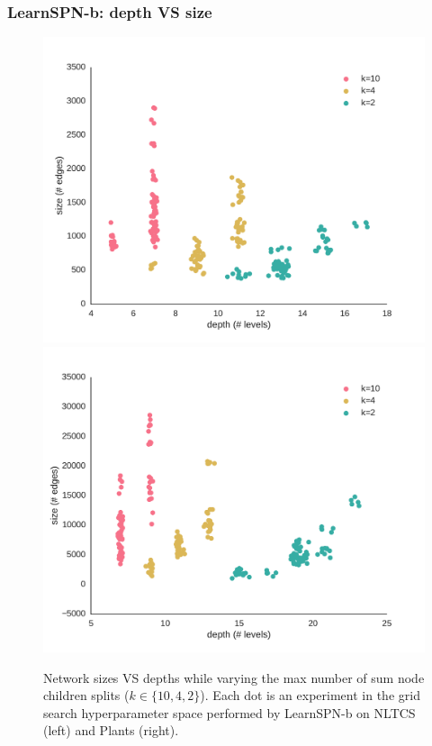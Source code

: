\documentclass[10pt, t, xcolor={usenames,dvipsnames,svgnames}, compress]{beamer}
\begin{document}
\begin{frame}
  \frametitle{LearnSPN-b: depth VS size}
  \begin{figure}[htbp]
    \begin{center}
      \includegraphics[width=0.5\linewidth]{figures/nltcs-depth.pdf}
      \includegraphics[width=0.5\linewidth]{figures/plants-depth.pdf}
      \caption{\footnotesize
        Network sizes VS depths while varying the max
        number of sum node children splits ($k\in\{10, 4, 2\}$). Each dot is an experiment
        in the grid search hyperparameter space performed by
        \textsf{LearnSPN-b} on NLTCS (left) and Plants (right).}
    \end{center}
  \end{figure}
\end{frame}
\end{document}
